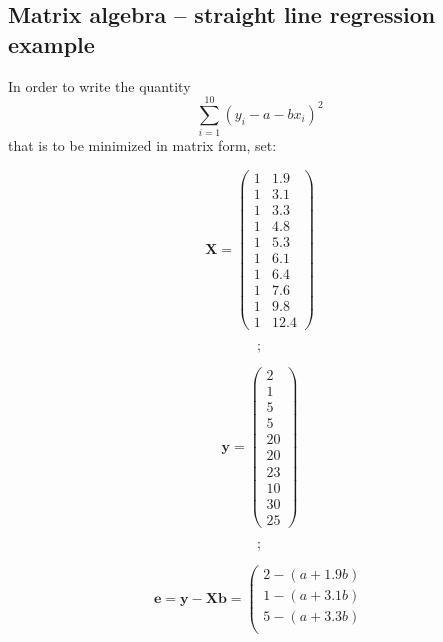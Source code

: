 \subsection{Matrix algebra -- straight line regression example}
In order to write the quantity
\[\sum_{i=1}^{10} (y_i - a - b x_i)^2\]
that is to be minimized in matrix form, set:
\begin{fullwidth}
\begin{minipage}[c]{0.25\textwidth}
\[
\mathbf{X} = \left( \begin{array}{cc}
  1 & 1.9\\
  1 & 3.1\\
  1 & 3.3\\
  1 & 4.8\\
  1 & 5.3\\
  1 & 6.1\\
  1 & 6.4\\
  1 & 7.6\\
  1 & 9.8\\
  1 & 12.4
\end{array} \right)
\]
    \end{minipage}
\begin{minipage}[c]{0.015\textwidth}
\[\mathbf{;}\]
\end{minipage}
\hspace{0.025\textwidth}
    \begin{minipage}[c]{0.18\textwidth}
\[
\mathbf{y} = \left( \begin{array}{c}
  2\\
  1\\
  5\\
  5\\
 20\\
 20\\
 23\\
 10\\
 30\\
 25
\end{array} \right)
\]
    \end{minipage}
    \begin{minipage}[c]{0.015\textwidth}
\[\mathbf{;}\]
\end{minipage}\hspace{0.05\textwidth}
\begin{minipage}[c]{0.44\textwidth}
\[\mathbf{e} = \mathbf{y} - \mathbf{X} \mathbf{b} =
\left( \begin{array}{c}
  2  - (a + 1.9 b)\\
  1  - (a + 3.1 b)\\
  5  - (a + 3.3 b)\\

\end{array}\]
\end{minipage}
\end{fullwidth}

